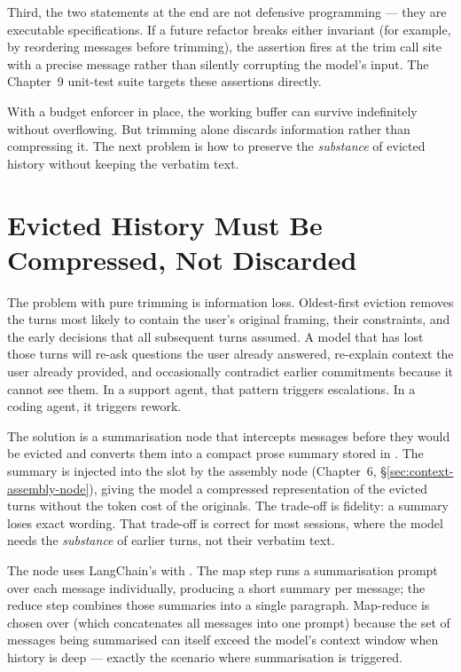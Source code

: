 Third, the two  statements at the end are not defensive
programming --- they are executable specifications. If a future
refactor breaks either invariant (for example, by reordering messages
before trimming), the assertion fires at the trim call site with a
precise message rather than silently corrupting the model's input. The
Chapter~9 unit-test suite targets these assertions directly.

With a budget enforcer in place, the working buffer can survive
indefinitely without overflowing. But trimming alone discards information
rather than compressing it. The next problem is how to preserve the
\emph{substance} of evicted history without keeping the verbatim text.

\section{Evicted History Must Be Compressed, Not Discarded}
\label{sec:summarization-node}

The problem with pure trimming is information loss. Oldest-first
eviction removes the turns most likely to contain the user's original
framing, their constraints, and the early decisions that all subsequent
turns assumed. A model that has lost those turns will re-ask questions
the user already answered, re-explain context the user already provided,
and occasionally contradict earlier commitments because it cannot see
them. In a support agent, that pattern triggers escalations. In a
coding agent, it triggers rework.

The solution is a summarisation node that intercepts messages before
they would be evicted and converts them into a compact prose summary
stored in . The summary is injected into the
 slot by the assembly node (Chapter~6,
\S\ref{sec:context-assembly-node}), giving the model a compressed
representation of the evicted turns without the token cost of the
originals. The trade-off is fidelity: a summary loses exact wording.
That trade-off is correct for most sessions, where the model needs the
\emph{substance} of earlier turns, not their verbatim text.

The node uses LangChain's  with
. The map step runs a summarisation
prompt over each message individually, producing a short summary per
message; the reduce step combines those summaries into a single
paragraph. Map-reduce is chosen over  (which concatenates
all messages into one prompt) because the set of messages being
summarised can itself exceed the model's context window when history is
deep --- exactly the scenario where summarisation is triggered.

